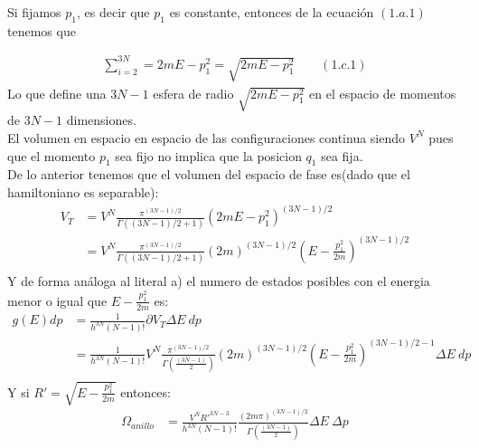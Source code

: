 Si fijamos $p_1$, es decir que $p_1$ es constante, entonces de la ecuación $(1.a.1)$ tenemos que
\begin{answer}
    \begin{align*}
        \sum_{i=2}^{3N} = 2mE - p_1^2 = \sqrt{2mE - p_1^2}  \qquad (1.c.1)
    \end{align*}
    Lo que define una $3N - 1$ esfera de radio $\sqrt{2mE - p_1^2}$ en el espacio de momentos de $3N - 1$ dimensiones.\\
    El volumen en espacio en espacio de las configuraciones continua siendo $V^N$ pues que el momento $p_1$ sea fijo no implica 
    que la posicion $q_1$ sea fija.\\
    De lo anterior tenemos que el volumen del espacio de fase es(dado que el hamiltoniano es separable):
    \begin{align*}
        V_{T} &= V^N \frac{\pi^{(3N-1)/2}}{\Gamma((3N-1)/2 + 1)} (2mE - p_1^2)^{(3N-1)/2} \\
        &= V^N \frac{\pi^{(3N-1)/2}}{\Gamma((3N-1)/2 + 1)} (2m)^{(3N-1)/2} \left(E - \frac{p_1^2}{2m}\right)^{(3N-1)/2} \\
    \end{align*}
    Y de forma análoga al literal a) el numero de estados posibles con el energia menor o igual que $E - \frac{p_1^2}{2m}$ es:
    \begin{align*}
        g(E)dp &= \frac{1}{h^{3N}(N-1)!} \partial V_T \Delta E ~dp\\
        &= \frac{1}{h^{3N}(N-1)!} V^N \frac{\pi^{(3N-1)/2}}{\Gamma\left(\frac{(3N-1)}2\right)} (2m)^{(3N-1)/2} \left(E - \frac{p_1^2}{2m}\right)^{(3N-1)/2 - 1} \Delta E ~dp\\
    \end{align*}
    Y si $R' = \sqrt{E - \frac{p_1^2}{2m}}$ entonces:
    \begin{align*}
        \Omega_{anillo} &= \frac{V^NR'^{3N-3}}{h^{3N}(N-1)!}  \frac{ (2m\pi)^{(3N-1)/2}}{\Gamma\left(\frac{(3N-1)}2\right)} \Delta E ~\Delta p\\
    \end{align*}
\end{answer}

